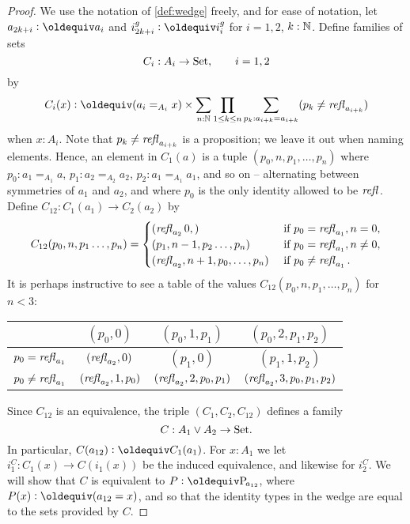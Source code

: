 {\begin{proof}
 We use the notation of \cref{def:wedge} freely, and for ease of notation, let $a_{2k+i}\defequi a_i$ and $i_{2k+i}^g\defequi i_i^g$ for $i=1,2$, $k:\mathbb{N}$.  %
Define families of sets
$$C_i:A_i\to\mathord{\mathrm{Set}},\qquad i=1,2$$
by 
$$C_i(x)\defequi(a_i=_{A_i}x)\times\sum_{n:\NN}\prod_{1\leq k\leq n}\sum_{p_k:a_{i+k}=%
  a_{i+k}}(p_k\neq\refl {a_{i+k}})$$
when $x:A_i$.  Note that $p_k\neq\mathop{\mathit{refl}_{a_{i+k}}}$  is a proposition; we leave it out when naming elements. Hence, an element in $C_1(a)$ is a tuple
$(p_0,n,p_1,\dots,p_n)$ where $p_0:a_1=_{A_1}a$, $p_1:a_2=_{A_2}a_2$, $p_2:a_1=_{A_1}a_1$, and so on -- alternating between symmetries of $a_1$ and $a_2$, and where $p_0$ is the only identity allowed to be $\mathop{\mathit{refl}_{}}$. Define $C_{12}:C_1(a_1)\to C_2(a_2)$ by
$$C_{12}(p_0,n,p_1\dots,p_n)=
\begin{cases}
  (\mathop{\mathit{refl}_{a_2}}0,)&\text{ if }p_0=\mathop{\mathit{refl}_{a_1}}, n=0,\\
  (p_1,n-1,p_2\dots,p_n)& \text{ if }p_0=\mathop{\mathit{refl}_{a_1}},n\neq0,\\
  (\mathop{\mathit{refl}_{a_2}},n+1,p_0,\dots,p_n)& \text{ if }p_0\neq\mathop{\mathit{refl}_{a_1}}.
\end{cases}
$$
It is perhaps instructive to see a table of the values $C_{12}(p_0,n,p_1,\dots,p_n)$ for $n<3$:
\begin{center}
  \begin{tabular}{r|c cc}
    &$(p_0,0)$&$(p_0,1,p_1)$&$(p_0,2,p_1,p_2)$\\
    \hline
    $p_0=\mathop{\mathit{refl}_{a_1}}$&$(\mathop{\mathit{refl}_{a_2}},0)$&$(p_1,0)$&$(p_1,1,p_2)$\\
    $p_0\neq\mathop{\mathit{refl}_{a_1}}$&$(\mathop{\mathit{refl}_{a_2}},1,p_0)$&$(\mathop{\mathit{refl}_{a_2}},2,p_0,p_1)$&$(\mathop{\mathit{refl}_{a_2}},3,p_0,p_1,p_2)$
  \end{tabular}
\end{center}
Since $C_{12}$ is an equivalence, the triple $(C_1,C_2,C_{12})$ defines a family
$$C:A_1\vee A_2\to\mathord{\mathrm{Set}}.$$
In particular, $C(a_{12})\defequi C_1(a_1)$.
For $x:A_1$ we let $i^C_1:C_1(x)\to C(i_1(x))$ be the induced equivalence, and likewise for $i^C_2$.
We will show that $C$ is equivalent to $P\defequi \pathsp{a_{12}}$, where $P(x)\defequi(a_{12}=x)$, and so that the identity types in the wedge are equal to the sets provided by $C$.


\end{proof}}
